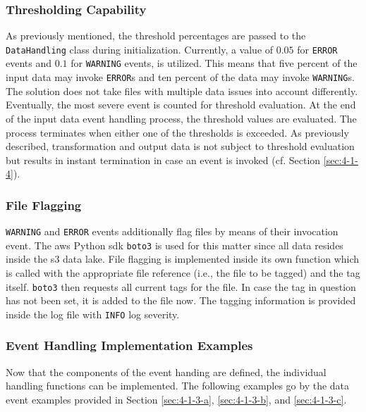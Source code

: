 \subsubsection{Thresholding Capability}
As previously mentioned, the threshold percentages are passed to the \texttt{DataHandling} class during initialization. Currently, a value of $0.05$ for \texttt{ERROR} events and $0.1$ for \texttt{WARNING} events, is utilized. This means that five percent of the input data may invoke \texttt{ERROR}s and ten percent of the data may invoke \texttt{WARNING}s. The solution does not take files with multiple data issues into account differently. Eventually, the most severe event is counted for threshold evaluation. At the end of the input data event handling process, the threshold values are evaluated. The process terminates when either one of the thresholds is exceeded. As previously described, transformation and output data is not subject to threshold evaluation but results in instant termination in case an event is invoked (cf. Section \ref{sec:4-1-4}).

\subsubsection{File Flagging}
\texttt{WARNING} and \texttt{ERROR} events additionally flag files by means of their invocation event. The \ac{aws} Python \ac{sdk} \texttt{boto3} is used for this matter since all data resides inside the \ac{s3} data lake. File flagging is implemented inside its own function which is called with the appropriate file reference (i.e., the file to be tagged) and the tag itself. \texttt{boto3} then requests all current tags for the file. In case the tag in question has not been set, it is added to the file now. The tagging information is provided inside the log file with \texttt{INFO} log severity.
\newpage
\subsubsection{Event Handling Implementation Examples}
Now that the components of the event handing are defined, the individual handling functions can be implemented. The following examples go by the data event examples provided in Section \ref{sec:4-1-3-a}, \ref{sec:4-1-3-b}, and \ref{sec:4-1-3-c}.

